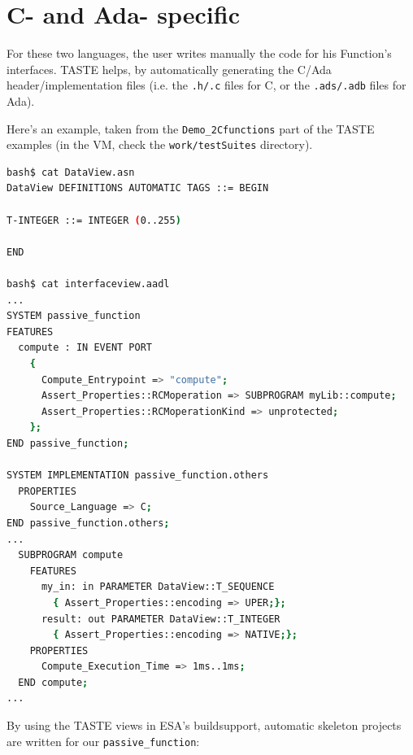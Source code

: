 \documentclass[11pt]{book}
\begin{document}
   \section{C- and Ada- specific}
   For these two languages, the user writes manually the code for his Function's interfaces.
   TASTE helps, by automatically generating the C/Ada header/implementation files (i.e.
   the {\tt .h/.c} files for C, or the {\tt .ads/.adb} files for Ada). 

   Here's an example, taken from the {\tt Demo\_2Cfunctions} part of the TASTE examples 
   (in the VM, check the {\tt work/testSuites} directory).

\begin{lstlisting}[language=bash]
bash$ cat DataView.asn
DataView DEFINITIONS AUTOMATIC TAGS ::= BEGIN

T-INTEGER ::= INTEGER (0..255)

END

bash$ cat interfaceview.aadl
...
SYSTEM passive_function
FEATURES
  compute : IN EVENT PORT
    {
      Compute_Entrypoint => "compute";
      Assert_Properties::RCMoperation => SUBPROGRAM myLib::compute;
      Assert_Properties::RCMoperationKind => unprotected;
    };
END passive_function;

SYSTEM IMPLEMENTATION passive_function.others
  PROPERTIES
    Source_Language => C;
END passive_function.others;
...
  SUBPROGRAM compute
    FEATURES
      my_in: in PARAMETER DataView::T_SEQUENCE
        { Assert_Properties::encoding => UPER;};
      result: out PARAMETER DataView::T_INTEGER
        { Assert_Properties::encoding => NATIVE;};
    PROPERTIES
      Compute_Execution_Time => 1ms..1ms;
  END compute;
...
\end{lstlisting}

By using the TASTE views in ESA's buildsupport, automatic skeleton projects are written for our {\tt passive\_function}:
\end{document}
